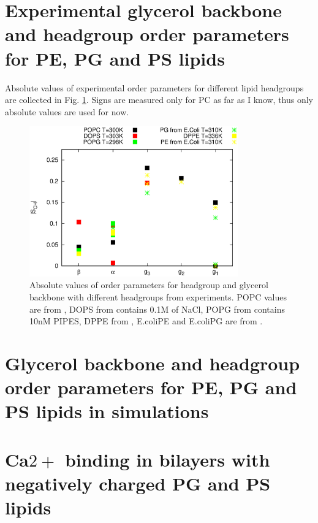 \documentclass[aps,prl,superscriptaddress,twocolumn]{revtex4}
\begin{document}

\section{Experimental glycerol backbone and headgroup order parameters for PE, PG and PS lipids}

Absolute values of experimental order parameters for different lipid headgroups are
collected in Fig. \ref{HGorderParameters}. Signs are measured only for PC as far as I know,
thus only absolute values are used for now.
\begin{figure}[]
  \centering
  \includegraphics[width=9.0cm]{../Figs/HGorderparameters.eps}
  \caption{\label{HGorderParameters}
    Absolute values of order parameters for headgroup and glycerol backbone with different headgroups
    from experiments. POPC values are from \cite{ferreira13}, DOPS from \cite{browning80} contains 0.1M of NaCl,
    POPG from \cite{borle85} contains 10nM PIPES, DPPE from \cite{seelig76}, E.coliPE and E.coliPG are from \cite{gally81}.
  }
\end{figure}

\section{Glycerol backbone and headgroup order parameters for PE, PG and PS lipids in simulations}


\section{Ca$2+$ binding in bilayers with negatively charged PG and PS lipids}
\end{document}
